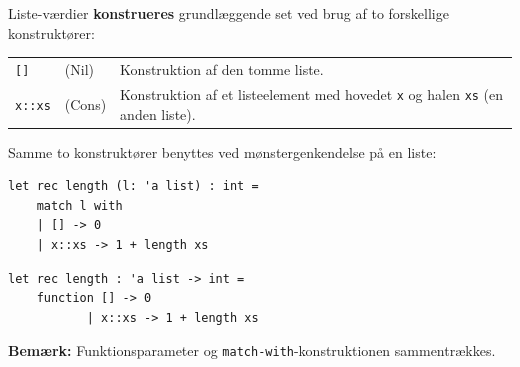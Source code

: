 \documentclass[rgb]{beamer}
\begin{document}
\begin{frame}[fragile]
\begin{footnotesize}


  \vspace{1ex}

  Liste-værdier \textbf{konstrueres} grundlæggende set ved brug af to forskellige konstruktører:

  \vspace{1ex}
  \begin{tabular}{llp{7cm}}
    \texttt{[]} & (Nil) & Konstruktion af den tomme liste.  \\
    \texttt{x::xs} & (Cons) & Konstruktion af et listeelement med hovedet \texttt{x} og halen \texttt{xs} (en anden liste).
  \end{tabular}

  \vspace{1ex}

  Samme to konstruktører benyttes ved mønstergenkendelse på en liste:
  \vspace{1ex}

\begin{lstlisting}[numbers=none,frame=none,mathescape]
  let rec length (l: 'a list) : int =
    match l with
    | [] -> 0
    | x::xs -> 1 + length xs
\end{lstlisting}

  \vspace{1ex}

\begin{lstlisting}[numbers=none,frame=none,mathescape]
  let rec length : 'a list -> int =
    function [] -> 0
           | x::xs -> 1 + length xs
\end{lstlisting}

\textbf{Bemærk:} Funktionsparameter og \lstinline{match-with}-konstruktionen sammentrækkes.

\end{footnotesize}
\end{frame}
\end{document}

